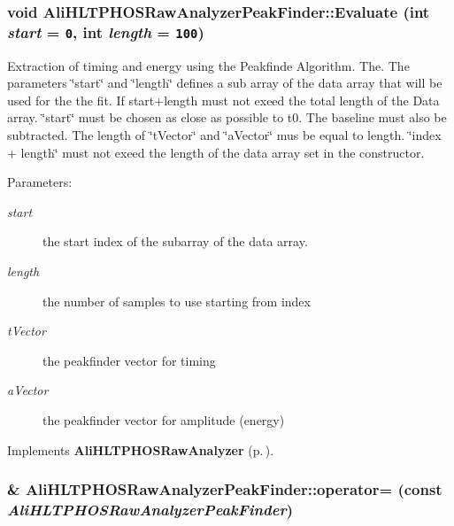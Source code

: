 \subsubsection{\setlength{\rightskip}{0pt plus 5cm}void Ali\-HLTPHOSRaw\-Analyzer\-Peak\-Finder::Evaluate (int {\em start} = {\tt 0}, int {\em length} = {\tt 100})\hspace{0.3cm}{\tt  [virtual]}}\label{classAliHLTPHOSRawAnalyzerPeakFinder_a6}


Extraction of timing and energy using the Peakfinde Algorithm. The. The parameters \char`\"{}start\char`\"{} and \char`\"{}length\char`\"{} defines a sub array of the data array that will be used for the the fit. If start+length must not exeed the total length of the Data array. \char`\"{}start\char`\"{} must be chosen as close as possible to t0. The baseline must also be subtracted. The length of \char`\"{}t\-Vector\char`\"{} and \char`\"{}a\-Vector\char`\"{} mus be equal to length. \char`\"{}index + length\char`\"{} must not exeed the length of the data array set in the constructor. \begin{Desc}
\item[Parameters:]
\begin{description}
\item[{\em start}]the start index of the subarray of the data array. \item[{\em length}]the number of samples to use starting from index \item[{\em t\-Vector}]the peakfinder vector for timing \item[{\em a\-Vector}]the peakfinder vector for amplitude (energy) \end{description}
\end{Desc}


Implements {\bf Ali\-HLTPHOSRaw\-Analyzer} {\rm (p.\,\pageref{classAliHLTPHOSRawAnalyzer_a14})}.
\subsubsection{\& Ali\-HLTPHOSRaw\-Analyzer\-Peak\-Finder::operator= (const  {\em Ali\-HLTPHOSRaw\-Analyzer\-Peak\-Finder})\hspace{0.3cm}{\tt  [inline]}}\label{classAliHLTPHOSRawAnalyzerPeakFinder_a2}


